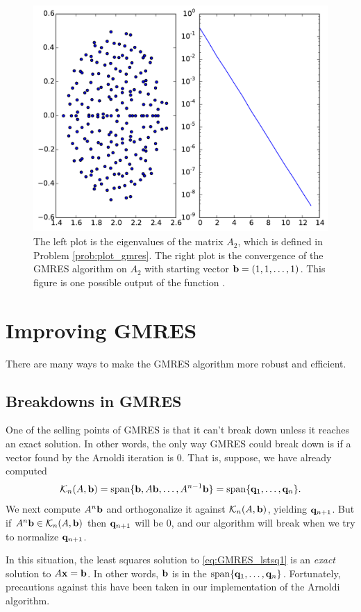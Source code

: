\begin{figure}[H]
\includegraphics[width=.7\textwidth]{plot_gmres.pdf}
\caption{The left plot is the eigenvalues of the matrix $A_2$, which is defined in Problem \ref{prob:plot_gmres}.
The right plot is the convergence of the GMRES algorithm on $A_2$ with starting vector ${\bf b} = (1, 1, \ldots, 1)$.
This figure is one possible output of the function .}
\label{fig:plot_gmres}
\end{figure}



\section*{Improving GMRES}
There are many ways to make the GMRES algorithm more robust and efficient.


\subsection*{Breakdowns in GMRES}
One of the selling points of GMRES is that it can't break down unless it reaches an exact solution.
In other words, the only way GMRES could break down is if a vector found by the Arnoldi iteration is 0.
That is, suppose, we have already computed 
\[\mathcal{K}_n(A, {\bf b}) = \text{span}\{{\bf b}, A{\bf b}, \ldots, A^{n-1}{\bf b}\} = \text{span}\{{\bf q}_1, \ldots, {\bf q}_n\}.\]
We next compute $A^n{\bf b}$ and orthogonalize it against $\mathcal{K}_n(A, {\bf b})$, yielding ${\bf q}_{n+1}$.
But if $A^n{\bf b} \in \mathcal{K}_n(A,{\bf b})$ then ${\bf q}_{n+1}$ will be 0, and our algorithm will break when we try to normalize ${\bf q}_{n+1}$.

In this situation, the least squares solution to \eqref{eq:GMRES_lstsq1} is an \emph{exact} solution to $A{\bf x}={\bf b}$. 
In other words, ${\bf b}$ is in the $\text{span}\{{\bf q}_1, \ldots, {\bf q}_n\}$.  Fortunately, precautions against this have been taken in our implementation of the Arnoldi algorithm.

